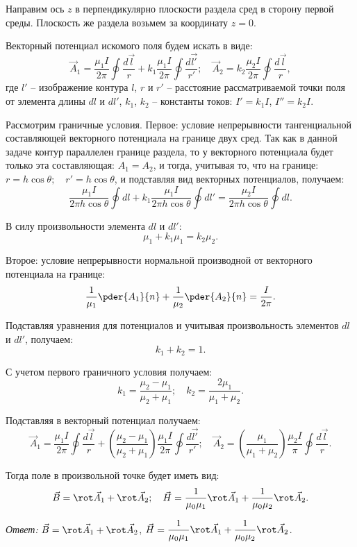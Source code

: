 Направим ось \( z \) в перпендикулярно плоскости раздела сред в сторону первой
среды. Плоскость же раздела возьмем за координату \( z = 0 \).

Векторный потенциал искомого поля будем искать в виде:
\[
	\vec{A}_1 = \frac{\mu_1 I}{2\pi} \oint \frac{d\vec{l}}{r} +
	k_1\frac{\mu_1 I}{2\pi} \oint \frac{d\vec{l'}}{r'}; \quad
	\vec{A}_2 = k_2\frac{\mu_2 I}{2\pi} \oint \frac{d\vec{l}}{r},
\]
где \( l' \) -- изображение контура \( l \), \( r \) и \( r' \) -- расстояние
рассматриваемой точки поля от элемента длины \( dl \) и \( dl' \),
\( k_1 \), \( k_2 \) -- константы токов: \( I' = k_1I \), \( I'' = k_2I \).

Рассмотрим граничные условия. Первое: условие непрерывности тангенциальной
составляющей векторного потенциала на границе двух сред. Так как в данной
задаче контур параллелен границе раздела, то у векторного потенциала будет
только эта составляющая: \( A_1 = A_2 \), и тогда, учитывая то, что на
границе: \( r = h\cos\theta; \quad r' = h\cos\theta \), и подставляя вид
векторных потенциалов, получаем:
\[
	\frac{\mu_1 I}{2\pi h\cos\theta} \oint dl + k_1\frac{\mu_1 I}{2\pi h\cos\theta}
	\oint dl' = \frac{\mu_2 I}{2\pi h\cos\theta} \oint dl.
\]

В силу произвольности элемента \( dl \) и \( dl' \):
\[ 
	\mu_1 + k_1\mu_1 = k_2\mu_2.
\]

Второе: условие непрерывности нормальной производной от векторного потенциала
на границе:
\[
	\frac{1}{\mu_1}\pder{A_1}{n} + \frac{1}{\mu_2}\pder{A_2}{n} = \frac{I}{2\pi}.
\]

Подставляя уравнения для потенциалов и учитывая произвольность элементов 
\( dl \) и \( dl' \), получаем:
\[
	k_1 + k_2 = 1.
\]

С учетом первого граничного условия получаем:
\[
	k_1 = \frac{\mu_2 - \mu_1}{\mu_2 + \mu_1}; \quad
	k_2 = \frac{2\mu_1}{\mu_1 + \mu_2}.
\]

Подставляя в векторный потенциал получаем:
\[
	\vec{A}_1 = \frac{\mu_1 I}{2\pi} \oint \frac{d\vec{l}}{r} + 
	\left(\frac{\mu_2 - \mu_1}{\mu_2 + \mu_1}\right)
	\frac{\mu_1 I}{2\pi} \oint \frac{d\vec{l'}}{r'}; \quad
	\vec{A}_2 = \left(\frac{\mu_1}{\mu_1 + \mu_2}\right)
	\frac{\mu_2 I}{\pi} \oint \frac{d\vec{l}}{r}.
\]

Тогда поле в произвольной точке будет иметь вид:
\[
	\vec{B} = \rot\vec{A}_1 + \rot\vec{A}_2; \quad
	\vec{H} = \frac{1}{\mu_0\mu_1}\rot\vec{A}_1 +
	\frac{1}{\mu_0\mu_2}\rot\vec{A}_2.
\]

\emph{Ответ:} \( \ds \vec{B} = \rot\vec{A}_1 + \rot\vec{A}_2 \),
\( \ds \vec{H} = \frac{1}{\mu_0\mu_1}\rot\vec{A}_1 + \frac{1}{\mu_0\mu_2}
\rot\vec{A}_2 \).

